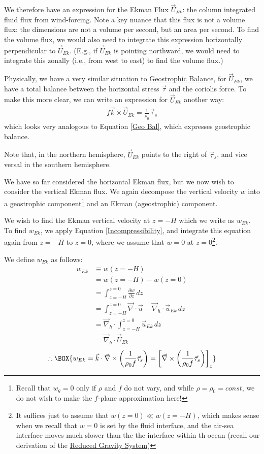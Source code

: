 We therefore have an expression for the Ekman Flux \(\vec{U}_{Ek}\): the column integrated fluid flux from wind-forcing. Note a key nuance that this flux is not a volume flux: the dimensions are not a volume per second, but an area per second. To find the volume flux, we would also need to integrate this expression horizontally perpendicular to \(\vec{U}_{Ek}\). (E.g., if \(\vec{U}_{Ek}\) is pointing northward, we would need to integrate this zonally (i.e., from west to east) to find the volume flux.)

Physically, we have a very similar situation to \hyperref[Geostrophic Box]{Geostrophic Balance}, for \(\vec{U}_{Ek}\), we have a total balance between the horizontal stress \(\vec{\tau}\) and the coriolis force. To make this more clear, we can write an expression for \(\vec{U}_{Ek}\) another way:
\begin{align*}
    f\vec{k}\times \vec{U}_{Ek} = \frac{1}{\rho_0}\vec{\tau}_s
\end{align*}
which looks very analogous to Equation \ref{Geo Bal}, which expresses geostrophic balance.

Note that, in the northern hemisphere, \(\vec{U}_{Ek}\) points to the right of \(\vec{\tau}_s\), and vice versal in the southern hemisphere.

We have so far considered the horizontal Ekman flux, but we now wish to consider the vertical Ekman flux. We again decompose the vertical velocity \(w\) into a geostrophic component\footnote{Recall that \(w_g=0\) only if \(\rho\) and \(f\) do not vary, and while \(\rho=\rho_0=const\), we do not wish to make the \(f\)-plane approximation here!} and an Ekman (ageostrophic) component. 

We wish to find the Ekman vertical velocity at \(z=-H\) which we write as \(w_{Ek}\). To find \(w_{Ek}\), we apply Equation \ref{Incompressibility}, and integrate this equation again from \(z=-H\) to \(z=0\), where we assume that \(w=0\) at \(z=0\)\footnote{It suffices just to assume that \(w(z=0)\ll w(z=-H)\), which makes sense when we recall that \(w=0\) is set by the fluid interface, and the air-sea interface moves much slower than the the interface within th ocean (recall our derivation of the \hyperref[RG Box]{Reduced Gravity System})}.

We define \(w_{Ek}\) as follows:
\begin{align*}
    w_{Ek}&\equiv
    w(z=-H)
    \\
    &= w(z=-H)-w(z=0)
    \\
    &=\int_{z=-H}^{z=0}\frac{\partial w}{\partial z}\,dz
    \\
    &=\int_{z=-H}^{z=0}\vec{\nabla}\cdot\vec{u} - \vec{\nabla}_h \cdot \vec{u}_{Ek}\,dz
    \\
    &=\vec{\nabla}_h \cdot\int_{z=-H}^{z=0}\vec{u}_{Ek}\,dz
    \\
    &=\vec{\nabla}_h \cdot \vec{U}_{Ek}
\end{align*}
\begin{gather}
    \therefore \BOX{
        w_{Ek}=\vec{k}\cdot \vec{\nabla} \times \left( \frac{1}{\rho_0 f}\vec{\tau}_s \right) = \left[
            \vec{\nabla} \times \left( \frac{1}{\rho_0 f}\vec{\tau}_s \right)
        \right]_z
    }
\end{gather}

